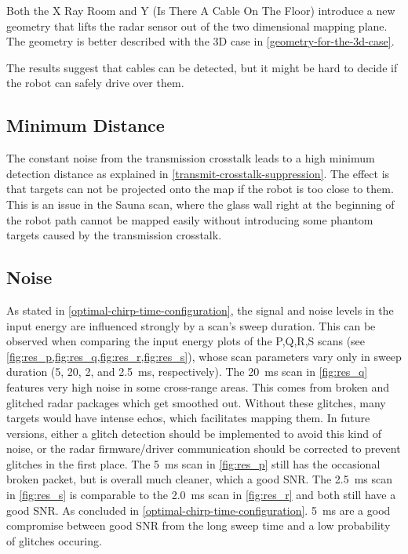 Both the X Ray Room and Y (Is There A Cable On The Floor) introduce a
new geometry that lifts the radar sensor out of the two dimensional
mapping plane. The geometry is better described with the 3D case in \cref{geometry-for-the-3d-case}.

The results suggest that cables can be detected, but it might be hard to decide if the robot can safely drive over them.


\subsection{Minimum Distance}\label{minimum-distance}
The constant noise from the transmission crosstalk leads to a high
minimum detection distance as explained in \cref{transmit-crosstalk-suppression}. The effect is that
targets can not be projected onto the map if the robot is too close to
them. This is an issue in the Sauna scan, where the glass wall right at
the beginning of the robot path cannot be mapped easily without introducing some phantom targets caused by the transmission crosstalk.


\subsection{Noise} \label{noise}
As stated in \cref{optimal-chirp-time-configuration}, the signal and noise levels in the input energy are influenced strongly by a scan's sweep duration. This can be observed when comparing the input energy plots of the P,Q,R,S scans (see \cref{fig:res_p,fig:res_q,fig:res_r,fig:res_s}), whose scan parameters vary only in sweep duration (5, 20, 2, and \SI{2.5}{ms}, respectively). The \SI{20}{ms} scan in \cref{fig:res_q} features very high noise in some cross-range areas. This comes from broken and glitched radar packages which get smoothed out. Without these glitches, many targets would have intense echos, which facilitates mapping them. In future versions, either a glitch detection should be implemented to avoid this kind of noise, or the radar firmware/driver communication should be corrected to prevent glitches in the first place. The \SI{5}{ms} scan in \cref{fig:res_p} still has the occasional broken packet, but is overall much cleaner, which a good SNR. The \SI{2.5}{ms} scan in \cref{fig:res_s} is comparable to the \SI{2.0}{ms} scan in \cref{fig:res_r} and both still have a good SNR. As concluded in \cref{optimal-chirp-time-configuration}. \SI{5}{ms} are a good compromise between good SNR from the long sweep time and a low probability of glitches occuring.

